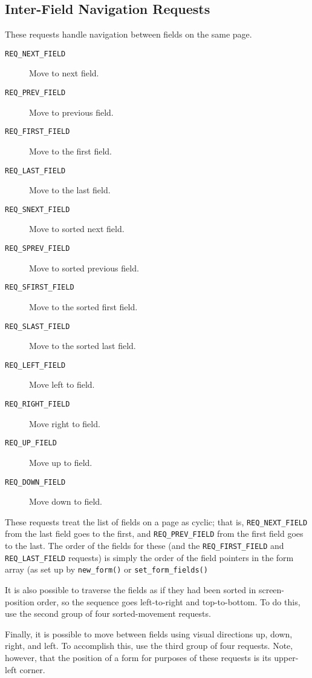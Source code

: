 \subsection{Inter-Field Navigation Requests}

These requests handle navigation between fields on the same page.
\begin{description}
\item[ \texttt{REQ\_NEXT\_FIELD}]  Move to next field.
\item[ \texttt{REQ\_PREV\_FIELD}]  Move to previous field.
\item[ \texttt{REQ\_FIRST\_FIELD}]  Move to the first field.
\item[ \texttt{REQ\_LAST\_FIELD}]  Move to the last field.
\item[ \texttt{REQ\_SNEXT\_FIELD}]  Move to sorted next field.
\item[ \texttt{REQ\_SPREV\_FIELD}]  Move to sorted previous field.
\item[ \texttt{REQ\_SFIRST\_FIELD}]  Move to the sorted first field.
\item[ \texttt{REQ\_SLAST\_FIELD}]  Move to the sorted last field.
\item[ \texttt{REQ\_LEFT\_FIELD}]  Move left to field.
\item[ \texttt{REQ\_RIGHT\_FIELD}]  Move right to field.
\item[ \texttt{REQ\_UP\_FIELD}]  Move up to field.
\item[ \texttt{REQ\_DOWN\_FIELD}]  Move down to field.
\end{description}
These requests treat the list of fields on a page as cyclic; that is,
\texttt{REQ\_NEXT\_FIELD} from the last field goes to the first, and
\texttt{REQ\_PREV\_FIELD} from the first field goes to the last. The
order of the fields for these (and the \texttt{REQ\_FIRST\_FIELD} and
\texttt{REQ\_LAST\_FIELD} requests) is simply the order of the field
pointers in the form array (as set up by \texttt{new\_form()} or
\texttt{set\_form\_fields()} 

It is also possible to traverse the fields as if they had been sorted in
screen-position order, so the sequence goes left-to-right and top-to-bottom.
To do this, use the second group of four sorted-movement requests.  

Finally, it is possible to move between fields using visual directions up,
down, right, and left.  To accomplish this, use the third group of four
requests.  Note, however, that the position of a form for purposes of these
requests is its upper-left corner. 

